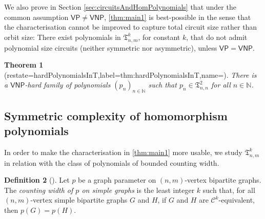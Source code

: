 \documentclass[11pt, DIV=15]{scrarticle}
\theoremstyle{definition}
\newtheorem{definition}{Definition}[section]
\theoremstyle{plain}
\newtheorem{theorem}[definition]{Theorem}
\theoremstyle{remark}
\newcommand{\bbN}{\mathbb{N}}
\newcommand{\VP}{\mathsf{VP}}
\newcommand{\VNP}{\mathsf{VNP}}
\begin{document}
We also prove in Section \ref{sec:circuitsAndHomPolynomials} that under the common assumption $\VP \neq \VNP$,
\cref{thm:main1} is best-possible in the sense that the
characterisation cannot be improved to capture total circuit size
rather than orbit size: There exist polynomials in
$\mathfrak{T}_{n,m}^k$, for constant $k$, that do not admit polynomial
size circuits (neither symmetric nor asymmetric), unless $\VP =
\VNP$. 
\begin{theorem}[restate=hardPolynomialsInT,label=thm:hardPolynomialsInT,name=]
	There is a $\VNP$-hard family of polynomials $(p_{n})_{n \in \bbN}$ such that $p_{n} \in \mathfrak{T}_{n,n}^2$ for all $n \in \mathbb{N}$.
\end{theorem}	

\subsection{Symmetric complexity of homomorphism polynomials}

In order to make the characterisation in \cref{thm:main1} more usable, we study $\mathfrak{T}^k_{n,m}$ in relation with the class of polynomials of bounded counting width.

\begin{definition}[\cite{anderson_symmetric_2017}]
	Let $p$ be a graph parameter on $(n,m)$-vertex bipartite graphs.
	The \emph{counting width of $p$ on simple graphs} is the least integer $k$ such that, for all $(n,m)$-vertex simple bipartite graphs $G$ and $H$, if $G$ and $H$ are $\mathcal{C}^k$-equivalent, then $p(G) = p(H)$.
\end{definition}

%
%
\end{document}
